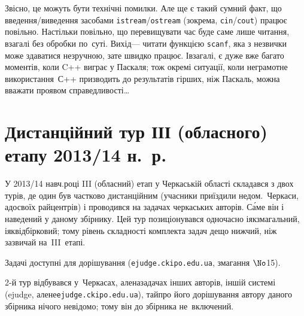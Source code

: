 \documentclass[14pt,a4paper]{extarticle}
\begin{document}
Звісно, це можуть бути технічні помилки. Але ще є такий сумний факт, що введення/\nolinebreak[2]виведення засобами \texttt{istream}/\nolinebreak[2]\texttt{ostream} (зокрема, \texttt{cin}/\nolinebreak[2]\texttt{cout}) працює повільно. Настільки повільно, що перевищувати час буде саме лише читання, взагалі без обробки по~суті. Вихід\nolinebreak[3] --- читати функцією \texttt{scanf}, яка з незвички може здаватися незруч\-ною, зате швидко працює. І\nolinebreak[3] взагалі, є дуже вже багато моментів, коли C++ виграє у Паскаля; тож окремі ситуації, коли неграмотне використання~С++ призводить до результатів гірших, ніж Паскаль, можна вважати проявом справедливості\dots






\section{Дистанційний тур ІІІ (обласного) етапу 2013/14 н.~р.}

У 2013/14 навч.\nolinebreak[3] році III (обласний) етап у Черкаській області складався з двох турів, де один був частково дистанційним (учасники приїздили не\nolinebreak[3] до\nolinebreak[3] м.~Черкаси, а\nolinebreak[3] до\nolinebreak[3] своїх райцентрів) і проводився на задачах черкаських авторів. С\'{а}ме він і наведений у даному збірнику. Цей тур позиціонувався одночасно і\nolinebreak[2] як\nolinebreak[2] змагальний, і\nolinebreak[2] як\nolinebreak[2] відбірковий; тому рівень складності комплекта задач дещо нижчий, ніж зазвичай на~III~етапі.

Задачі доступні для дорішування (\verb"ejudge.ckipo.edu.ua", змагання $\No$15). 

2-й тур відбувався у~Черкасах, але\nolinebreak[2] на\nolinebreak[2] задачах інших авторів, іншій системі (ejudge, але\nolinebreak[2] не\nolinebreak[2] \verb"ejudge.ckipo.edu.ua"), та\nolinebreak[3] й\nolinebreak[3] про його дорішування автору даного збірника нічого не\nolinebreak[3] відомо; тому він до збірника не~включений.



\renewenvironment{problemAllDefault}[1]{\vspace{10mm}\par\begin{problem}{#1}{Клавіатура (stdin) або файл input.txt}{Екран (stdout)}{1 сек}{64 мегабайти}}{\end{problem}}
\end{document}
